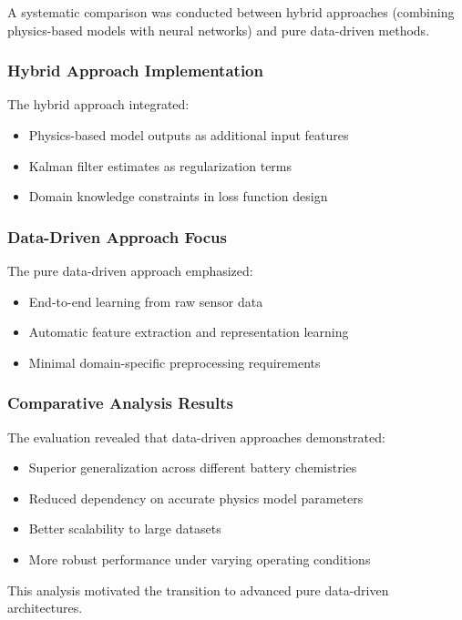 A systematic comparison was conducted between hybrid approaches (combining physics-based models with neural networks) and pure data-driven methods.

\subsubsection{Hybrid Approach Implementation}

The hybrid approach integrated:
\begin{itemize}
    \item Physics-based model outputs as additional input features
    \item Kalman filter estimates as regularization terms
    \item Domain knowledge constraints in loss function design
\end{itemize}

\subsubsection{Data-Driven Approach Focus}

The pure data-driven approach emphasized:
\begin{itemize}
    \item End-to-end learning from raw sensor data
    \item Automatic feature extraction and representation learning
    \item Minimal domain-specific preprocessing requirements
\end{itemize}

\subsubsection{Comparative Analysis Results}

The evaluation revealed that data-driven approaches demonstrated:
\begin{itemize}
    \item Superior generalization across different battery chemistries
    \item Reduced dependency on accurate physics model parameters
    \item Better scalability to large datasets
    \item More robust performance under varying operating conditions
\end{itemize}

This analysis motivated the transition to advanced pure data-driven architectures.

